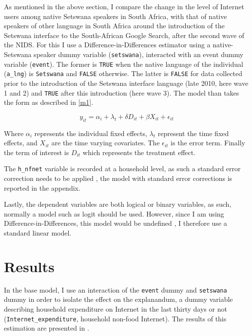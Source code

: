 \documentclass[a4paper,british]{article}\usepackage[]{graphicx}\usepackage[]{xcolor}
\providecommand*{\code}[1]{\texttt{#1}}
\begin{document}
\label{subsec:estimation}As mentioned in the above section, I compare
the change in the level of Internet users among native Setswana speakers
in South Africa, with that of native speakers of other language in
South Africa around the introduction of the Setswana interface to
the South-African Google Search, after the second wave of the NIDS.
For this I use a Difference-in-Differences estimator \citep{abadie2005semiparametric,imbens2009econometrics}
using a native-Setswana speaker dummy variable (\code{setswana}),
interacted with an event dummy variable (\code{event}). The former
is \code{TRUE} when the native language of the individual (\code{a\_lng})
is \code{Setswana} and \code{FALSE} otherwise. The latter is \code{FALSE}
for data collected prior to the introduction of the Setswana interface
language (late 2010, here wave 1 and 2) and \code{TRUE} after this
introduction (here wave 3). The model than takes the form as described
in \eqref{m1}.

\begin{equation}
y_{it}=\alpha_{i}+\lambda_{t}+\delta D{}_{it}+\beta X_{it}+\epsilon_{it}\label{eq:m1}
\end{equation}

Where $\alpha_{i}$ represents the individual fixed effects, $\lambda_{t}$
represent the time fixed effects, and $X_{it}$ are the time varying
covariates. The $\epsilon_{it}$ is the error term. Finally the term
of interest is $D_{it}$ which represents the treatment effect.

The \code{h\_nfnet} variable is recorded at a household level, as
such a standard error correction needs to be applied \citep{white1980heteroskedasticity},
the model with standard error corrections is reported in the appendix.

Lastly, the dependent variables are both logical or binary variables,
as such, normally a model such as logit should be used. However, since
I am using Difference-in-Differences, this model would be undefined
\citep{wooldridge2010econometric}, I therefore use a standard linear
model. 

\section{Results}

\label{sec:results}In the base model, I use an interaction of the
\code{event} dummy and \code{setswana} dummy in order to isolate
the effect on the explanandum, a dummy variable describing household
expenditure on Internet in the last thirty days or not (\code{Internet\_expenditure},
household non-food Internet). The results of this estimation are presented
in .
\end{document}
